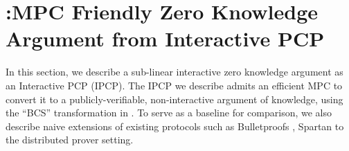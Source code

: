 \section{\name:MPC Friendly Zero Knowledge Argument from Interactive
PCP}\label{sec:graphene}
In this section, we describe a sub-linear interactive zero knowledge argument as
an Interactive PCP (IPCP). The IPCP we describe admits an efficient MPC to
convert it to a publicly-verifiable, non-interactive argument of knowledge,
using the ``BCS'' transformation in \cite{BCS16}.  To serve as a
baseline for comparison, we also describe naive extensions of existing protocols
such as Bulletproofs \cite{bulletproofs}, Spartan \cite{spartan} to the
distributed prover setting. 

